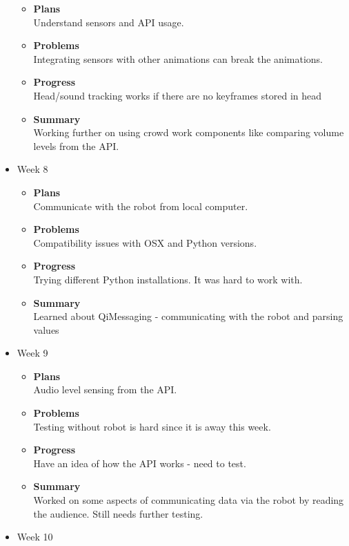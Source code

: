 \begin{itemize}
\begin{itemize}
				\item \textbf{Plans} \\
				Understand sensors and API usage.
				\item \textbf{Problems} \\
				Integrating sensors with other animations can break the animations.
				\item \textbf{Progress} \\
				Head/sound tracking works if there are no keyframes stored in head
				\item \textbf{Summary} \\
				Working further on using crowd work components like comparing volume levels from the API.
			\end{itemize}
		\item{Week 8}
			\begin{itemize}
				\item \textbf{Plans} \\
				Communicate with the robot from local computer.
				\item \textbf{Problems} \\
				Compatibility issues with OSX and Python versions.
				\item \textbf{Progress} \\
				Trying different Python installations. It was hard to work with.
				\item \textbf{Summary} \\
				Learned about QiMessaging - communicating with the robot and parsing values
			\end{itemize}
		\item{Week 9}
			\begin{itemize}
				\item \textbf{Plans} \\
				Audio level sensing from the API.
				\item \textbf{Problems} \\
				Testing without robot is hard since it is away this week.
				\item \textbf{Progress} \\
				Have an idea of how the API works - need to test.
				\item \textbf{Summary} \\
				Worked on some aspects of communicating data via the robot by reading the audience. Still needs further testing.
			\end{itemize}
		\item{Week 10}
			\begin{itemize}

\end{itemize}
\end{itemize}

